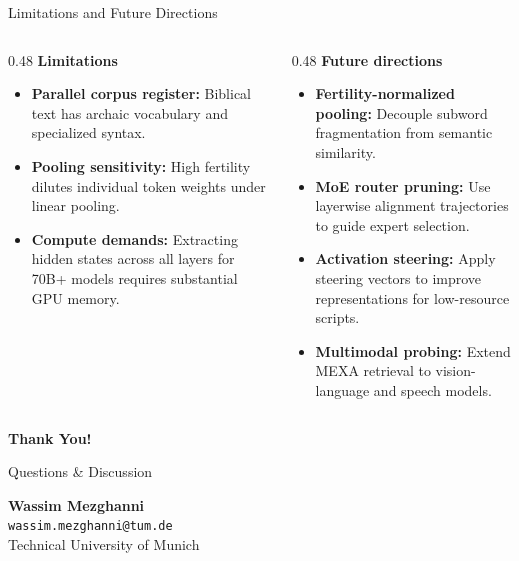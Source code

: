 \documentclass[
  english,
  aspectratio=169,
]{tumbeamer}
\begin{document}
\begin{frame}{Limitations and Future Directions}
  \begin{columns}[T]
    \begin{column}{0.48\textwidth}
      \textbf{Limitations}
      \begin{itemize}\small
        \item \textbf{Parallel corpus register:} Biblical text has archaic vocabulary and specialized syntax.
        \item \textbf{Pooling sensitivity:} High fertility dilutes individual token weights under linear pooling.
        \item \textbf{Compute demands:} Extracting hidden states across all layers for 70B+ models requires substantial GPU memory.
      \end{itemize}
    \end{column}
    \begin{column}{0.48\textwidth}
      \textbf{Future directions}
      \begin{itemize}\small
        \item \textbf{Fertility-normalized pooling:} Decouple subword fragmentation from semantic similarity.
        \item \textbf{MoE router pruning:} Use layerwise alignment trajectories to guide expert selection.
        \item \textbf{Activation steering:} Apply steering vectors to improve representations for low-resource scripts.
        \item \textbf{Multimodal probing:} Extend MEXA retrieval to vision-language and speech models.
      \end{itemize}
    \end{column}
  \end{columns}
\end{frame}

\begin{frame}[plain]
  \centering
  \vspace{2em}
  {\Huge \textbf{Thank You!}}
  
  \vspace{1.5em}
  {\Large Questions \& Discussion}
  
  \vspace{2em}
  \textbf{Wassim Mezghanni}\\
  \texttt{wassim.mezghanni@tum.de}\\
  \vspace{0.5em}
  \small Technical University of Munich
\end{frame}
\end{document}
